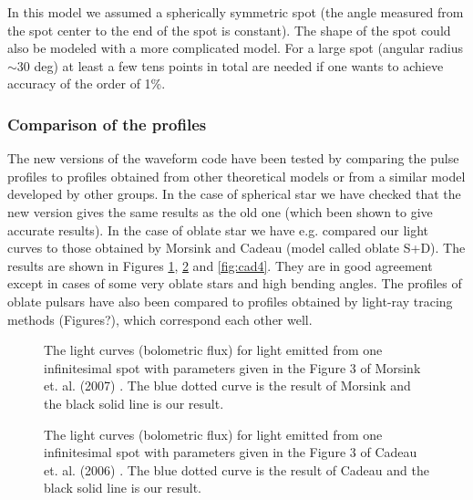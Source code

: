 \documentclass{wihuri}
\begin{document}
In this model we assumed a spherically symmetric spot (the angle measured from the spot center to the end of the spot is constant). The shape of the spot could also be modeled with a more complicated model. For a large spot (angular radius $\sim$30 deg) at least a few tens points in total are needed if one wants to achieve accuracy of the order of 1\%.



\subsubsection{Comparison of the profiles}

The new versions of the waveform code have been tested by comparing the pulse profiles to profiles obtained from other theoretical models or from a similar model developed by other groups. In the case of spherical star we have checked that the new version gives the same results as the old one (which been shown to give accurate results). In the case of oblate star we have e.g. compared our light curves to those obtained by Morsink \cite{morsink} and Cadeau \cite{cadeau} (model called oblate S+D). The results are shown in Figures \ref{fig:mor3}, \ref{fig:cad3} and \ref{fig:cad4}. They are in good agreement except in cases of some very oblate stars and high bending angles. The profiles of oblate pulsars have also been compared to profiles obtained by light-ray tracing methods (Figures?), which correspond each other well. 

\begin{figure}
\centerline{}
\caption{The light curves (bolometric flux) for light emitted from one infinitesimal spot with parameters given in the Figure 3 of Morsink et. al. (2007) \cite{morsink}. The blue dotted curve is the result of Morsink and the black solid line is our result.
\label{fig:mor3}}
\end{figure}


\begin{figure}
\centerline{}
\caption{The light curves (bolometric flux) for light emitted from one infinitesimal spot with parameters given in the Figure 3 of Cadeau et. al. (2006) \cite{cadeau}. The blue dotted curve is the result of Cadeau and the black solid line is our result.
\label{fig:cad3}}
\end{figure}
\end{document}
